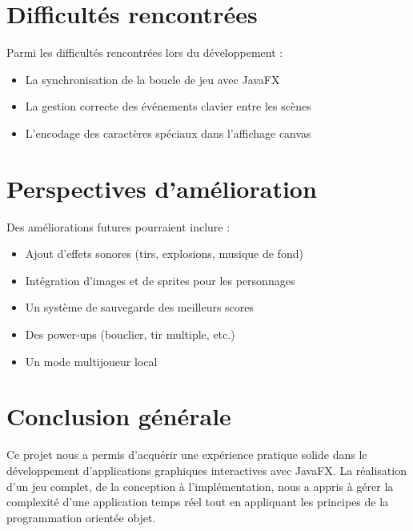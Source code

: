 \documentclass[12pt,a4paper]{report}
\begin{document}
\section{Difficultés rencontrées}
Parmi les difficultés rencontrées lors du développement :
\begin{itemize}[leftmargin=1.5cm]
  \item La synchronisation de la boucle de jeu avec JavaFX
  \item La gestion correcte des événements clavier entre les scènes
  \item L'encodage des caractères spéciaux dans l'affichage canvas
\end{itemize}

\section{Perspectives d'amélioration}
Des améliorations futures pourraient inclure :
\begin{itemize}[leftmargin=1.5cm]
  \item Ajout d'effets sonores (tirs, explosions, musique de fond)
  \item Intégration d'images et de sprites pour les personnages
  \item Un système de sauvegarde des meilleurs scores
  \item Des power-ups (bouclier, tir multiple, etc.)
  \item Un mode multijoueur local
\end{itemize}

\section{Conclusion générale}
Ce projet nous a permis d'acquérir une expérience pratique solide dans le développement d'applications graphiques interactives avec JavaFX. La réalisation d'un jeu complet, de la conception à l'implémentation, nous a appris à gérer la complexité d'une application temps réel tout en appliquant les principes de la programmation orientée objet.
\end{document}
